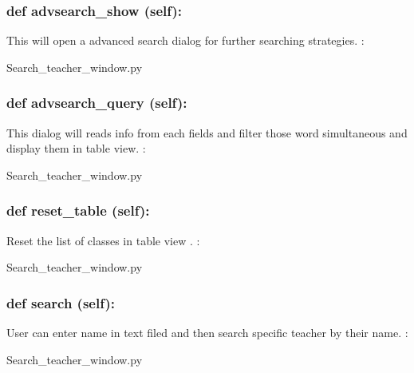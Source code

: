 \hypertarget{class_poly_a14a7ad77ce612b0c54f531d307ee4b39}{
\subsubsection[{def advsearch_show (self):}]{\setlength{\rightskip}{0pt plus 5cm}def {advsearch\_show} (self):}}\label{class_poly_a14a7ad77ce612b0c54f531d307ee4b39}
This will open a advanced search dialog for further searching strategies. 
:\begin{DoxyCompactItemize}
\item 
Search\_teacher\_window.\-py\end{DoxyCompactItemize}

\hypertarget{class_poly_a14a7ad77ce612b0c54f531d307ee4b39}{
\subsubsection[{def advsearch_query (self):}]{\setlength{\rightskip}{0pt plus 5cm}def {advsearch\_query} (self):}}\label{class_poly_a14a7ad77ce612b0c54f531d307ee4b39}
This dialog will reads info from each fields and filter those word simultaneous and display them in table view. 
:\begin{DoxyCompactItemize}
\item 
Search\_teacher\_window.\-py\end{DoxyCompactItemize}

\hypertarget{class_poly_a14a7ad77ce612b0c54f531d307ee4b39}{
\subsubsection[{def reset_table (self):}]{\setlength{\rightskip}{0pt plus 5cm}def {reset\_table} (self):}}\label{class_poly_a14a7ad77ce612b0c54f531d307ee4b39}
Reset the list of classes in table view .
:\begin{DoxyCompactItemize}
\item 
Search\_teacher\_window.\-py\end{DoxyCompactItemize}

\hypertarget{class_poly_a14a7ad77ce612b0c54f531d307ee4b39}{
\subsubsection[{def search (self):}]{\setlength{\rightskip}{0pt plus 5cm}def {search} (self):}}\label{class_poly_a14a7ad77ce612b0c54f531d307ee4b39}
User can enter name in text filed and then search specific teacher by their name.
:\begin{DoxyCompactItemize}
\item 
Search\_teacher\_window.\-py\end{DoxyCompactItemize}

